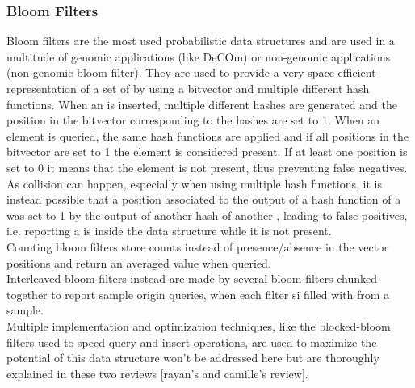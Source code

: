 \subsubsection{Bloom Filters}
Bloom filters are the most used probabilistic data structures and are used in a multitude of genomic applications (like DeCOm) or non-genomic applications (non-genomic bloom filter). They are used to provide a very space-efficient representation of a set of \kmers by using a bitvector and multiple different hash functions. When an \kmer is inserted, multiple different hashes are generated and the position in the bitvector corresponding to the hashes are set to 1. When an element is queried, the same hash functions are applied and if all positions in the bitvector are set to 1 the element is considered present. If at least one position is set to 0 it means that the element is not present, thus preventing false negatives. As collision can happen, especially when using multiple hash functions, it is instead possible that a position associated to the output of a hash function of a \kmer was set to 1 by the output of another hash of another \kmer, leading to false positives, i.e. reporting a \kmer is inside the data structure while it is not present.\\
Counting bloom filters store counts instead of presence/absence in the vector positions and return an averaged value when queried.\\
Interleaved bloom filters instead are made by several bloom filters chunked together to report sample origin queries, when each filter si filled with \kmers from a sample.\\
Multiple implementation and optimization techniques, like the blocked-bloom filters used to speed query and insert operations, are used to maximize the potential of this data structure won't be addressed here but are thoroughly explained in these two reviews [rayan's and camille's review]. 
